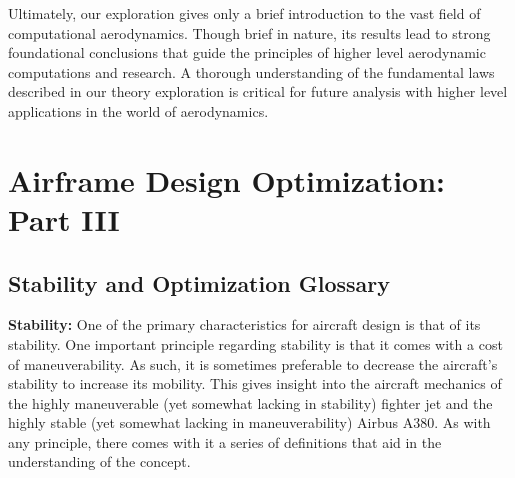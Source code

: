 \documentclass{report}
\begin{document}
Ultimately, our exploration gives only a brief introduction to the vast field of computational aerodynamics. Though brief in nature, its results lead to strong foundational conclusions that guide the principles of higher level
aerodynamic computations and research. A thorough understanding of the fundamental laws described in our theory exploration is critical for future analysis with higher level applications in the world of aerodynamics.


\chapter{Airframe Design Optimization: Part III}
\section{Stability and Optimization Glossary}
\textbf{Stability:} One of the primary characteristics for aircraft design is that of its stability. One important principle regarding stability is that it comes with a cost of maneuverability.
As such, it is sometimes preferable to decrease the aircraft's stability to increase its mobility. This gives insight into the aircraft mechanics of the highly maneuverable (yet somewhat lacking in stability) fighter jet
and the highly stable (yet somewhat lacking in maneuverability) Airbus A380. As with any principle, there comes with it a series of definitions that aid in the understanding of the concept.
\end{document}
